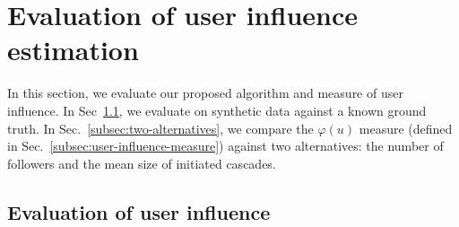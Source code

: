 
\section{Evaluation of user influence estimation}
\label{sec:evaluation-influence}






In this section, we evaluate our proposed algorithm and measure of user influence.
In Sec~\ref{subsec:ground-truth}, we evaluate on synthetic data against a known ground truth.
In Sec.~\ref{subsec:two-alternatives}, we compare the $\varphi(u)$ measure (defined in Sec.~\ref{subsec:user-influence-measure}) against two alternatives: the number of followers and the mean size of initiated cascades.

\subsection{Evaluation of user influence}
\label{subsec:ground-truth}

